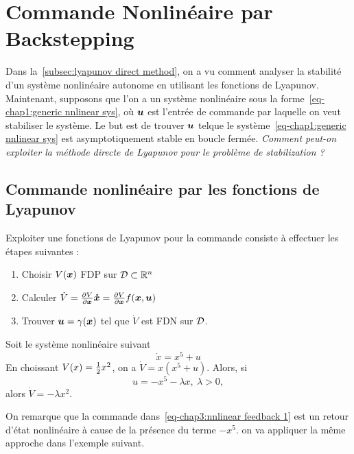 \graphicspath{{Figures/}}
\chapter{Commande Nonlinéaire par Backstepping} \label{chap:backstepping}
Dans la~\cref{subsec:lyapunov direct method}, on a vu comment analyser la stabilité d'un système nonlinéaire autonome en utilisant les fonctions de Lyapunov. Maintenant, supposons que l'on a un système nonlinéaire sous la forme~\eqref{eq-chap1:generic nnlinear sys}, où $\bm{u}$ est l'entrée de commande par laquelle on veut stabiliser le système. Le but est de trouver $\bm{u}$ telque le système~\eqref{eq-chap1:generic nnlinear sys} est asymptotiquement stable en boucle fermée. \emph{Comment peut-on exploiter la méthode directe de Lyapunov pour le problème de stabilization ?} 
\section{Commande nonlinéaire par les fonctions de Lyapunov} 
Exploiter une fonctions  de Lyapunov pour la commande consiste à effectuer les étapes suivantes : 
\begin{enumerate}
	\item Choisir $V(\bm{x})$ FDP sur ${\cal D}\subset\mathbb{R}^n$
	\item Calculer $\dot{V} = \frac{\partial V}{\partial \bm{x}}\bm{\dot{x}} = \frac{\partial V}{\partial \bm{x}}f(\bm{x},\bm{u})$
	\item Trouver $\bm{u}=\gamma(\bm{x})$ tel que $\dot{V}$ est FDN sur ${\cal D}$. 
\end{enumerate}
\begin{example}
	Soit le système nonlinéaire suivant
	 \begin{equation*}
		\dot{x} = x^5 + u
		\end{equation*}
	En choissant $V(x) = \frac{1}{2} x^2$, on a $\dot{V} = x(x^5+u)$. Alors, si 
	\begin{equation}\label{eq-chap3:nnlinear feedback 1}
		u = -x^5-\lambda x, \  \lambda>0,
	\end{equation} alors $\dot{V} = -\lambda x^2$. 
\end{example}
On remarque que la commande dans~\eqref{eq-chap3:nnlinear feedback 1} est un retour d'état nonlinéaire à cause de la présence du terme $-x^5$. on va appliquer la même approche dans l'exemple suivant. 
